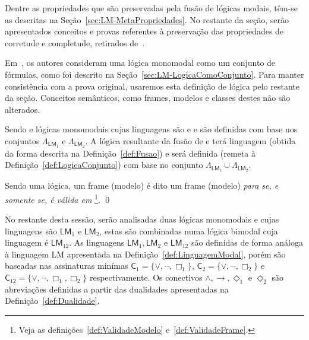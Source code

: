         Dentre as propriedades que são preservadas pela fusão de lógicas modais, têm-se as descritas na Seção~\ref{sec:LM-MetaPropriedades}.
        No restante da seção, serão apresentados conceitos e provas referentes à preservação das propriedades de corretude e completude, retirados de~.

        Em~, os autores consideram uma lógica monomodal como um conjunto de fórmulas, como foi descrito na Seção~\ref{sec:LM-LogicaComoConjunto}.
        Para manter consistência com a prova original, usaremos esta definição de lógica pelo restante da seção.
        Conceitos semânticos, como frames, modelos e classes destes não são alterados.

        \begin{definicao}
            \label{def:FusaoLogicasConjunto}
            Sendo  e  lógicas monomodais cujas linguagens são  e  e são definidas com base nos conjuntos
            \(\Lambda_{\mathsf{LM}_{1}}\) e \(\Lambda_{\mathsf{LM}_{2}}\). A lógica  resultante da fusão de  e  terá
            linguagem  (obtida da forma descrita na Definição~\ref{def:Fusao}) e será definida (remeta à Definição~\ref{def:LogicaConjunto})
            com base no conjunto \(\Lambda_{\mathsf{LM}_{1}} \mathbin{\cup} \Lambda_{\mathsf{LM}_{2}}\).
        \end{definicao}

        \begin{definicao}
            Sendo  uma lógica, um frame (modelo)  é dito um frame (modelo) \textit{para  se, e somente se,  é válida em
            }\footnote{Veja as definições~\ref{def:ValidadeModelo} e~\ref{def:ValidadeFrame}.}. \qed
        \end{definicao}

        No restante desta sessão, serão analisadas duas lógicas monomodais  e  cujas linguagens são \(\mathsf{LM}_1\) e \(\mathsf{LM}_2\),
        estas são combinadas numa lógica bimodal  cuja linguagem é \(\mathsf{LM}_{12}\). As linguagens \(\mathsf{LM}_{1}, \mathsf{LM}_{2} \text{ e } \mathsf{LM}_{12}\)
        são definidas de forma análoga à linguagem \textsf{LM} apresentada na Definição~\ref{def:LinguagemModal}, porém são baseadas nas assinaturas minímas
        \(\mathsf{C}_1 = \{\lor, \neg, \Box_{1}\}\), \(\mathsf{C}_2 =\{\lor, \neg, \Box_{2}\}\) e \(\mathsf{C}_{12} = \{\lor, \neg, \Box_{1}, \Box_{2}\}\)
        respectivamente. Os conectivos \(\land, \to, \Diamond_1 \text{ e } \Diamond_2\) são abreviações definidas a partir das dualidades apresentadas na Definição~\ref{def:Dualidade}.

